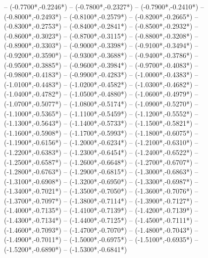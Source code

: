 {	-- ({-0.7700*\dx},{-0.2246*\dy})
	-- ({-0.7800*\dx},{-0.2327*\dy})
	-- ({-0.7900*\dx},{-0.2410*\dy})
	-- ({-0.8000*\dx},{-0.2493*\dy})
	-- ({-0.8100*\dx},{-0.2579*\dy})
	-- ({-0.8200*\dx},{-0.2665*\dy})
	-- ({-0.8300*\dx},{-0.2753*\dy})
	-- ({-0.8400*\dx},{-0.2841*\dy})
	-- ({-0.8500*\dx},{-0.2932*\dy})
	-- ({-0.8600*\dx},{-0.3023*\dy})
	-- ({-0.8700*\dx},{-0.3115*\dy})
	-- ({-0.8800*\dx},{-0.3208*\dy})
	-- ({-0.8900*\dx},{-0.3303*\dy})
	-- ({-0.9000*\dx},{-0.3398*\dy})
	-- ({-0.9100*\dx},{-0.3494*\dy})
	-- ({-0.9200*\dx},{-0.3590*\dy})
	-- ({-0.9300*\dx},{-0.3688*\dy})
	-- ({-0.9400*\dx},{-0.3786*\dy})
	-- ({-0.9500*\dx},{-0.3885*\dy})
	-- ({-0.9600*\dx},{-0.3984*\dy})
	-- ({-0.9700*\dx},{-0.4083*\dy})
	-- ({-0.9800*\dx},{-0.4183*\dy})
	-- ({-0.9900*\dx},{-0.4283*\dy})
	-- ({-1.0000*\dx},{-0.4383*\dy})
	-- ({-1.0100*\dx},{-0.4483*\dy})
	-- ({-1.0200*\dx},{-0.4582*\dy})
	-- ({-1.0300*\dx},{-0.4682*\dy})
	-- ({-1.0400*\dx},{-0.4782*\dy})
	-- ({-1.0500*\dx},{-0.4880*\dy})
	-- ({-1.0600*\dx},{-0.4979*\dy})
	-- ({-1.0700*\dx},{-0.5077*\dy})
	-- ({-1.0800*\dx},{-0.5174*\dy})
	-- ({-1.0900*\dx},{-0.5270*\dy})
	-- ({-1.1000*\dx},{-0.5365*\dy})
	-- ({-1.1100*\dx},{-0.5459*\dy})
	-- ({-1.1200*\dx},{-0.5552*\dy})
	-- ({-1.1300*\dx},{-0.5643*\dy})
	-- ({-1.1400*\dx},{-0.5733*\dy})
	-- ({-1.1500*\dx},{-0.5821*\dy})
	-- ({-1.1600*\dx},{-0.5908*\dy})
	-- ({-1.1700*\dx},{-0.5993*\dy})
	-- ({-1.1800*\dx},{-0.6075*\dy})
	-- ({-1.1900*\dx},{-0.6156*\dy})
	-- ({-1.2000*\dx},{-0.6234*\dy})
	-- ({-1.2100*\dx},{-0.6310*\dy})
	-- ({-1.2200*\dx},{-0.6383*\dy})
	-- ({-1.2300*\dx},{-0.6454*\dy})
	-- ({-1.2400*\dx},{-0.6522*\dy})
	-- ({-1.2500*\dx},{-0.6587*\dy})
	-- ({-1.2600*\dx},{-0.6648*\dy})
	-- ({-1.2700*\dx},{-0.6707*\dy})
	-- ({-1.2800*\dx},{-0.6763*\dy})
	-- ({-1.2900*\dx},{-0.6815*\dy})
	-- ({-1.3000*\dx},{-0.6863*\dy})
	-- ({-1.3100*\dx},{-0.6908*\dy})
	-- ({-1.3200*\dx},{-0.6950*\dy})
	-- ({-1.3300*\dx},{-0.6987*\dy})
	-- ({-1.3400*\dx},{-0.7021*\dy})
	-- ({-1.3500*\dx},{-0.7050*\dy})
	-- ({-1.3600*\dx},{-0.7076*\dy})
	-- ({-1.3700*\dx},{-0.7097*\dy})
	-- ({-1.3800*\dx},{-0.7114*\dy})
	-- ({-1.3900*\dx},{-0.7127*\dy})
	-- ({-1.4000*\dx},{-0.7135*\dy})
	-- ({-1.4100*\dx},{-0.7139*\dy})
	-- ({-1.4200*\dx},{-0.7139*\dy})
	-- ({-1.4300*\dx},{-0.7134*\dy})
	-- ({-1.4400*\dx},{-0.7125*\dy})
	-- ({-1.4500*\dx},{-0.7111*\dy})
	-- ({-1.4600*\dx},{-0.7093*\dy})
	-- ({-1.4700*\dx},{-0.7070*\dy})
	-- ({-1.4800*\dx},{-0.7043*\dy})
	-- ({-1.4900*\dx},{-0.7011*\dy})
	-- ({-1.5000*\dx},{-0.6975*\dy})
	-- ({-1.5100*\dx},{-0.6935*\dy})
	-- ({-1.5200*\dx},{-0.6890*\dy})
	-- ({-1.5300*\dx},{-0.6841*\dy})
}
